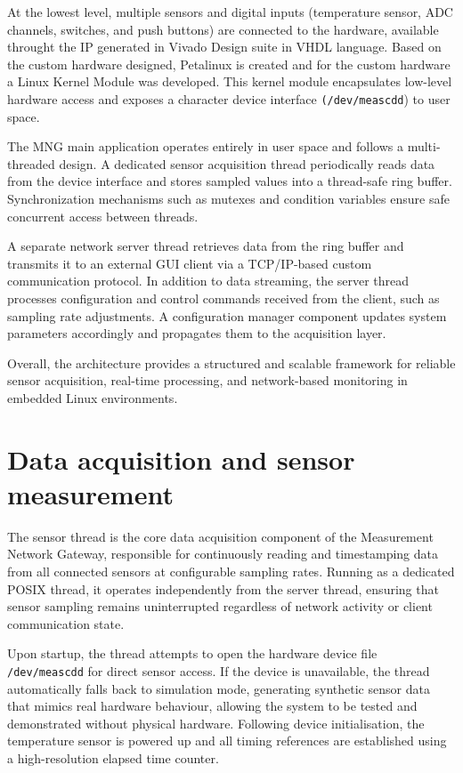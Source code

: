 At the lowest level, multiple sensors and digital inputs (temperature sensor, ADC channels, switches, and push buttons) are connected to the hardware, available throught the IP generated in Vivado Design suite in VHDL language. Based on the custom hardware designed, Petalinux is created and for the custom hardware a Linux Kernel Module was developed. This kernel module encapsulates low-level hardware access and exposes a character device interface \texttt{(/dev/meascdd}) to user space.

The MNG main application operates entirely in user space and follows a multi-threaded design. A dedicated sensor acquisition thread periodically reads data from the device interface and stores sampled values into a thread-safe ring buffer. Synchronization mechanisms such as mutexes and condition variables ensure safe concurrent access between threads.

A separate network server thread retrieves data from the ring buffer and transmits it to an external GUI client via a TCP/IP-based custom communication protocol. In addition to data streaming, the server thread processes configuration and control commands received from the client, such as sampling rate adjustments. A configuration manager component updates system parameters accordingly and propagates them to the acquisition layer.

Overall, the architecture provides a structured and scalable framework for reliable sensor acquisition, real-time processing, and network-based monitoring in embedded Linux environments.

\section{Data acquisition and sensor measurement}
The sensor thread is the core data acquisition component of the Measurement Network Gateway, responsible for continuously reading and timestamping data from all connected sensors at configurable sampling rates. Running as a dedicated POSIX thread, it operates independently from the server thread, ensuring that sensor sampling remains uninterrupted regardless of network activity or client communication state.

Upon startup, the thread attempts to open the hardware device file \texttt{/dev/meascdd} for direct sensor access. If the device is unavailable, the thread automatically falls back to simulation mode, generating synthetic sensor data that mimics real hardware behaviour, allowing the system to be tested and demonstrated without physical hardware. Following device initialisation, the temperature sensor is powered up and all timing references are established using a high-resolution elapsed time counter.

